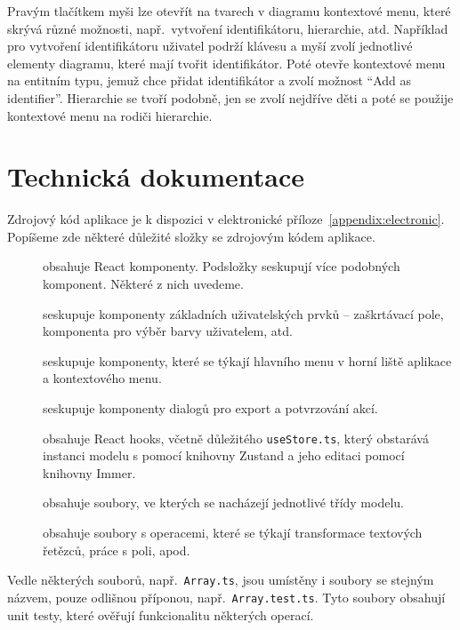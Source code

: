 Pravým tlačítkem myši lze otevřít na tvarech v diagramu kontextové menu, které skrývá různé možnosti, např.~vytvoření identifikátoru, hierarchie, atd.
Například pro vytvoření identifikátoru uživatel podrží klávesu  a myší zvolí jednotlivé elementy diagramu, které mají tvořit identifikátor.
Poté otevře kontextové menu na entitním typu, jemuž chce přidat identifikátor a zvolí možnost \enquote{Add as identifier}.
Hierarchie se tvoří podobně, jen se zvolí nejdříve děti a poté se použije kontextové menu na rodiči hierarchie.

\section{Technická dokumentace}

Zdrojový kód aplikace je k dispozici v elektronické příloze~\ref{appendix:electronic}.
Popíšeme zde některé důležité složky se zdrojovým kódem aplikace.

\begin{description}
  \item[] obsahuje React komponenty.
    Podsložky seskupují více podobných komponent.
    Některé z nich uvedeme.
  \item[] seskupuje komponenty základních uživatelských prvků -- zaškrtávací pole, komponenta pro výběr barvy uživatelem, atd.
  \item[] seskupuje komponenty, které se týkají hlavního menu v horní liště aplikace a kontextového menu.
  \item[] seskupuje komponenty dialogů pro export a potvrzování akcí.
  \item[] obsahuje React hooks, včetně důležitého \texttt{useStore.ts}, který obstarává instanci modelu s pomocí knihovny Zustand a jeho editaci pomocí knihovny Immer.
  \item[] obsahuje soubory, ve kterých se nacházejí jednotlivé třídy modelu.
  \item[] obsahuje soubory s operacemi, které se týkají transformace textových řetězců, práce s poli, apod.
\end{description}

Vedle některých souborů, např.~\texttt{Array.ts}, jsou umístěny i soubory se stejným názvem, pouze odlišnou příponou, např.~\texttt{Array.test.ts}.
Tyto soubory obsahují unit testy, které ověřují funkcionalitu některých operací.

